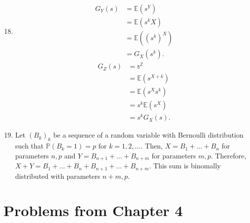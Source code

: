 \documentclass{article}
\begin{document}
\begin{enumerate}
    \setcounter{enumi}{17}
    \item 
    
    \begin{align*}
        G_Y(s) &= \mathbb{E}(s^Y)\\
        &= \mathbb{E}(s^kX)\\
        &= \mathbb{E}((s^k)^X)\\
        &= G_X(s^k).
    \end{align*}
    \begin{align*}
        G_Z(s) &= \mathbb{s^Z}\\
        &= \mathbb{E}(s^{X+k})\\
        &= \mathbb{E}(s^Xs^k)\\
        &= s^k\mathbb{E}(s^X)\\
        &= s^kG_X(s).
    \end{align*}
    
    \setcounter{enumi}{40}
    \item
    
    Let $(B_k)_k$ be a sequence of a random variable with Bernoulli distribution such that $\mathbb{P}(B_k=1)=p \text{ for } k=1, 2, ...$. Then, $X = B_1+...+B_n$ for parameters $n, p$ and $Y= B_{n+1}+ ... + B_{n+m}$ for parameters $m, p$. Therefore, $X+Y = B_1 + ... + B_n + B_{n+1}+ ... + B_{n+m}$. This sum is binomally distributed with parameters $n+m, p$.
    
\end{enumerate}

\section{Problems from Chapter 4}
\end{document}

